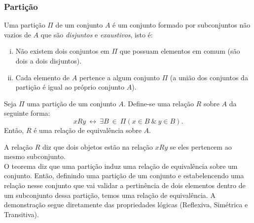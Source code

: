       \subsubsection{Partição}
         \begin{definition}
            Uma partição $\Pi$ de um conjunto $A$ é um conjunto formado por subconjuntos não vazios de $A$ que são \textit{disjuntos} e \textit{exaustivos}, isto é:
               \begin{enumerate}[i.]
                  \item Não existem dois conjuntos em $\Pi$ que possuam elementos em comum (são dois a dois disjuntos).
                  \item Cada elemento de $A$ pertence a algum conjunto $\Pi$ (a união dos conjuntos da partição é igual ao próprio conjunto $A$).
               \end{enumerate}
         \end{definition}
         \begin{theorem}
            Seja $\Pi$ uma partição de um conjunto $A$. Define-se uma relação $R$ sobre $A$ da seguinte forma:
            $$xRy\ \leftrightarrow\ \exists B\ \in\ \Pi (x \in B\ \&\ y \in B).$$
            Então, $R$ é uma relação de equivalência sobre $A$.
         \end{theorem}
         A relação $R$ diz que dois objetos estão na relação $xRy$ se eles pertencem ao mesmo subconjunto.\\
         O teorema diz que uma partição induz uma relação de equivalência sobre um conjunto. Então, definindo uma partição de um conjunto e estabelencendo uma relação nesse conjunto que vai validar a pertinência de dois elementos dentro de um subconjunto dessa partição, temos uma relação de equivalência.
         A demonstração segue diretamente das propriedades lógicas (Reflexiva, Simétrica e Transitiva).
